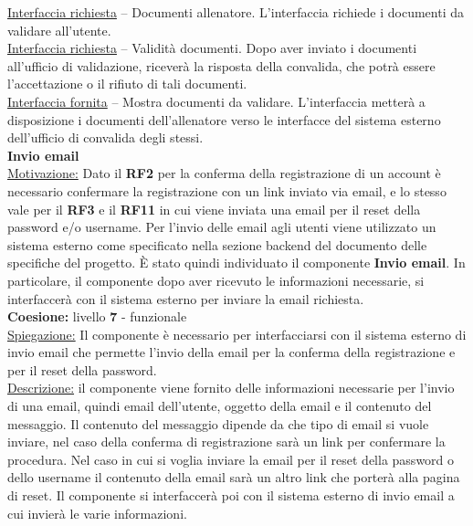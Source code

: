 \documentclass{article}
\begin{document}
      \underline{Interfaccia richiesta} – Documenti allenatore. L’interfaccia richiede i documenti da validare all’utente.\\

      \underline{Interfaccia richiesta} – Validità documenti. Dopo aver inviato i documenti all’ufficio di validazione, riceverà la risposta della convalida, che potrà essere
      l’accettazione o il rifiuto di tali documenti.\\

      \underline{Interfaccia fornita} – Mostra documenti da validare. L’interfaccia metterà a disposizione i documenti dell’allenatore verso le interfacce del sistema esterno 
      dell’ufficio di convalida degli stessi.\\


      {\Large\textbf{Invio email}}\\

      \underline{Motivazione:} Dato il \textbf{RF2} per la conferma della registrazione di un account è necessario confermare la registrazione con un link inviato via email, e lo stesso vale
      per il \textbf{RF3} e il \textbf{RF11} in cui viene inviata una email per il reset della password e/o username. Per l’invio delle email agli utenti viene utilizzato un sistema esterno come
      specificato nella sezione backend del documento delle specifiche del progetto. È stato quindi individuato il componente \textbf{Invio email}. In particolare, il componente dopo aver
      ricevuto le informazioni necessarie, si interfaccerà con il sistema esterno per inviare la email richiesta.\\

      \textbf{Coesione:} livello \textbf{7} - funzionale\\

      \underline{Spiegazione:} Il componente è necessario per interfacciarsi con il sistema esterno di invio email che permette l’invio della email per la conferma della registrazione
      e per il reset della password.\\

      \underline{Descrizione:} il componente viene fornito delle informazioni necessarie per l’invio di una email, quindi email dell’utente, oggetto della email e il contenuto del
      messaggio. Il contenuto del messaggio dipende da che tipo di email si vuole inviare, nel caso della conferma di registrazione sarà un link per confermare la procedura. Nel caso
      in cui si voglia inviare la email per il reset della password o dello username il contenuto della email sarà un altro link che porterà alla pagina di reset. Il componente si
      interfaccerà poi con il sistema esterno di invio email a cui invierà le varie informazioni.\\
\end{document}
